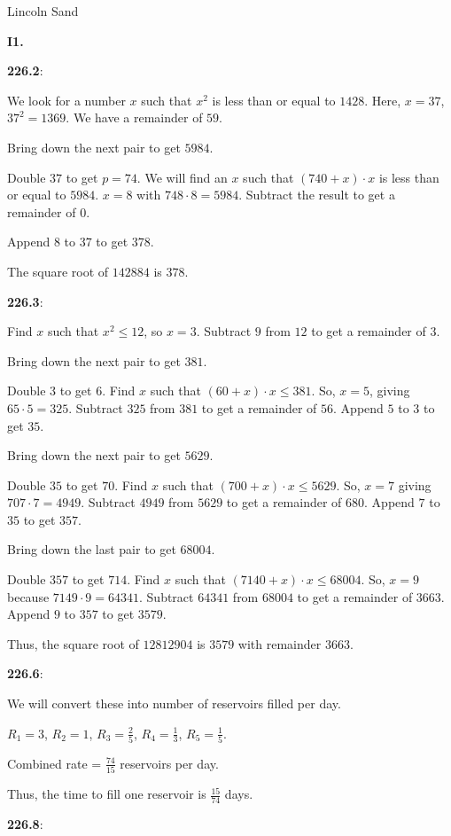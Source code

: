 \documentclass{article}
\begin{document}
\Large{Lincoln Sand}


\textbf{I1.}

\textbf{226.2}:

We look for a number $x$ such that $x^2$ is less than or equal to $1428$. Here, $x = 37$,
$37^2 = 1369$.
We have a remainder of $59$.

Bring down the next pair to get $5984$.

Double $37$ to get $p = 74$.
We will find an $x$ such that $(740 + x) \cdot x$ is less than or equal to $5984$.
$x = 8$ with $748 \cdot 8 = 5984$.
Subtract the result to get a remainder of $0$.

Append $8$ to $37$ to get $378$.

The square root of $142884$ is $378$.


\textbf{226.3}:

Find $x$ such that $x^2 \leq 12$, so $x = 3$.
Subtract $9$ from $12$ to get a remainder of $3$.

Bring down the next pair to get $381$.

Double $3$ to get $6$. Find $x$ such that $(60 + x) \cdot x \leq 381$.
So, $x = 5$, giving $65 \cdot 5 = 325$.
Subtract $325$ from $381$ to get a remainder of $56$.
Append $5$ to $3$ to get $35$.

Bring down the next pair to get $5629$.

Double $35$ to get $70$.
Find $x$ such that $(700 + x) \cdot x \leq 5629$.
So, $x = 7$ giving $707 \cdot 7 = 4949$.
Subtract $4949$ from $5629$ to get a remainder of $680$.
Append $7$ to $35$ to get $357$.

Bring down the last pair to get $68004$.

Double $357$ to get $714$. Find $x$ such that $(7140 + x) \cdot x \leq 68004$.
So, $x = 9$ because $7149 \cdot 9 = 64341$.
Subtract $64341$ from $68004$ to get a remainder of $3663$.
Append $9$ to $357$ to get $3579$.

Thus, the square root of $12812904$ is $3579$ with remainder $3663$.


\textbf{226.6}:

We will convert these into number of reservoirs filled per day.

$R_1 = 3$, $R_2 = 1$, $R_3 = \frac{2}{5}$, $R_4 = \frac{1}{3}$, $R_5 = \frac{1}{5}$.

Combined rate = $\frac{74}{15}$ reservoirs per day.

Thus, the time to fill one reservoir is $\frac{15}{74}$ days.


\textbf{226.8}:
\end{document}
